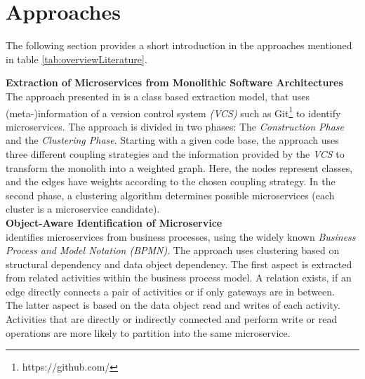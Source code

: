 \clearpage





\section{Approaches}
\label{sec:stateOfTheArt:approaches}
The following section provides a short introduction in the approaches mentioned in table \ref{tab:overviewLiterature}. 

\noindent
\textbf{Extraction of Microservices from Monolithic Software Architectures   } \\
The approach presented in \cite{ExtractionMazlami} is a class based extraction model, that uses (meta-)information of a version control system \textit{(VCS)} such as Git\footnote{https://github.com/} to identify microservices. The approach is divided in two phases: The \textit{Construction Phase} and the \textit{Clustering Phase}.
Starting with a given code base, the approach uses three different coupling strategies and the information provided by the \textit{VCS} to transform the monolith into a weighted graph. Here, the nodes represent classes, and the edges have weights according to the chosen coupling strategy. In the second phase, a clustering algorithm determines possible microservices (each cluster is a microservice candidate). \\

\noindent
\textbf{Object-Aware Identification of Microservice  } \\
\cite{ObjectAwareAmiri} identifies microservices from business processes, using the widely known \textit{Business Process and Model Notation (BPMN)}. The approach uses clustering based on structural dependency and data object dependency. The first aspect is extracted from related activities within the business process model. A relation exists, if an edge directly connects a pair of activities or if only gateways are in between. \\
The latter aspect is based on the data object read and writes of each activity. Activities that are directly or indirectly connected and perform write or read operations are more likely to partition into the same microservice. \\


